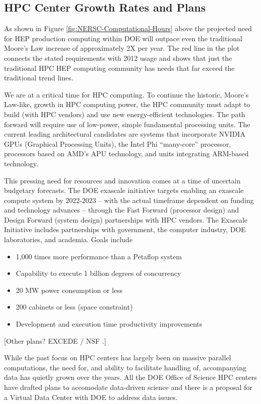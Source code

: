\subsection{HPC Center Growth Rates and Plans}
 
As shown in Figure \ref{fig:NERSC-Computational-Hours} above the projected need for HEP production computing within DOE will outpace even the traditional Moore's Law increase of approximately 2X per year.  The red line in the plot connects the stated requirements with 2012 usage and shows that just the traditional HPC HEP computing community has needs that far exceed the traditional trend lines. 
 
We are at a critical time for HPC computing. To continue the historic, Moore's Law-like, growth in HPC computing power, the HPC community must adapt to build (with HPC vendors) and use new energy-efficient technologies. The path forward will require use of low-power, simple fundamental processing units. The current leading architectural candidates are systems that incorporate NVIDIA GPUs (Graphical Processing Units), the Intel Phi ``many-core'' processor, processors based on AMD's APU technology, and units integrating ARM-based technology.

This pressing need for resources and innovation comes at a time of uncertain budgetary forecasts. The DOE exascale initiative targets enabling an exascale compute system by 2022-2023 -- with the actual timeframe dependent on funding and technology advances -- through the Fast Forward (processor design) and Design Forward (system design) partnerships with HPC vendors. The Exascale Initiative includes partnerships with government, the computer industry, DOE laboratories, and academia.  Goals include
\begin{itemize}
\item{1,000 times more performance than a Petaflop system}
\item{Capability to execute 1 billion degrees of concurrency}
\item{20 MW power consumption or less}
\item{200 cabinets or less (space constraint)}
\item{Development and execution time productivity improvements}
\end{itemize}
 
[Other plans? EXCEDE / NSF .]
 
 
While the past focus on HPC centers has largely been on massive parallel computations, the need for, and ability to facilitate handling of, accompanying data has quietly grown over the years. 
All the DOE Office of Science HPC centers have drafted plans to accomodate data-driven science and 
there is a proposal for a Virtual Data Center with DOE to address data issues. 

